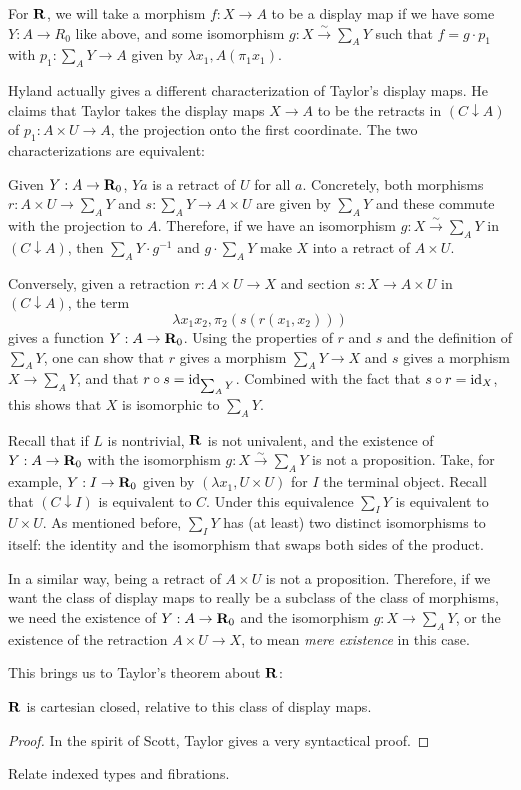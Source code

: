 \begin{definition}
  For $ \mathbf{R} $, we will take a morphism $ f: X \to A $ to be a display map if we have some $ Y : A \to R_0 $ like above, and some isomorphism $ g: X \xrightarrow{\sim} \sum_A Y $ such that $ f = g \cdot p_1 $ with $ p_1 : \sum_A Y \to A $ given by $ \lambda x_1, A (\pi_1 x_1) $.
\end{definition}

\begin{remark}
  Hyland actually gives a different characterization of Taylor's display maps. He claims that Taylor takes the display maps $ X \to A $ to be the retracts in $ (C \downarrow A) $ of $ p_1: A \times U \to A $,
  the projection onto the first coordinate. The two characterizations are equivalent:

  Given $ Y: A \to \mathbf{R}_0 $, $ Y a $ is a retract of $ U $ for all $ a $. Concretely, both morphisms $ r : A \times U \to \sum_A Y $ and $ s : \sum_A Y \to A \times U $ are given by $ \sum_A Y $ and these commute with the projection to $ A $. Therefore, if we have an isomorphism $ g: X \xrightarrow{\sim} \sum_A Y $ in $ (C \downarrow A) $, then $ \sum_A Y \cdot g^{-1} $ and $ g \cdot \sum_A Y $ make $ X $ into a retract of $ A \times U $.

  Conversely, given a retraction $ r : A \times U \to X $ and section $ s : X \to A \times U $ in $ (C \downarrow A) $, the term
  \[ \lambda x_1 x_2, \pi_2 (s (r (x_1, x_2))) \]
  gives a function $ Y : A \to \mathbf{R}_0 $. Using the properties of $ r $ and $ s $ and the definition of $ \sum_A Y $, one can show that $ r $ gives a morphism $ \sum_A Y \to X $ and $ s $ gives a morphism $ X \to \sum_A Y $, and that $ r \circ s = \text{id}_{\sum_A Y} $. Combined with the fact that $ s \circ r = \text{id}_{X} $, this shows that $ X $ is isomorphic to $ \sum_A Y $.
\end{remark}

\begin{remark}
  Recall that if $ L $ is nontrivial, $ \mathbf{R} $ is not univalent, and the existence of $ Y: A \to \mathbf{R}_0 $ with the isomorphism $ g: X \xrightarrow{\sim} \sum_A Y $ is not a proposition. Take, for example, $ Y : I \to \mathbf{R}_0 $ given by $ (\lambda x_1, U \times U) $ for $ I $ the terminal object. Recall that $ (C \downarrow I) $ is equivalent to $ C $. Under this equivalence $ \sum_I Y $ is equivalent to $ U \times U $. As mentioned before, $ \sum_I Y $ has (at least) two distinct isomorphisms to itself: the identity and the isomorphism that swaps both sides of the product.

  In a similar way, being a retract of $ A \times U $ is not a proposition. Therefore, if we want the class of display maps to really be a subclass of the class of morphisms, we need the existence of $ Y: A \to \mathbf{R}_0 $ and the isomorphism $ g : X \to \sum_A Y $, or the existence of the retraction $ A \times U \to X $, to mean \textit{mere existence} in this case.
\end{remark}

This brings us to Taylor's theorem about $ \mathbf{R} $:
\begin{theorem}
  $ \mathbf{R} $ is cartesian closed, relative to this class of display maps.
\end{theorem}
\begin{proof}
  In the spirit of Scott, Taylor gives a very syntactical proof.
\end{proof}

\TODO Relate indexed types and fibrations.
